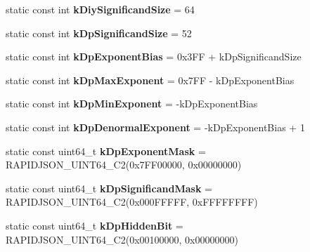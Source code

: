 \begin{DoxyCompactItemize}
\item 
static const int {\bfseries k\+Diy\+Significand\+Size} = 64\hypertarget{structinternal_1_1_diy_fp_a04f345587c1a89ae1c8d6a8091975072}{}\label{structinternal_1_1_diy_fp_a04f345587c1a89ae1c8d6a8091975072}

\item 
static const int {\bfseries k\+Dp\+Significand\+Size} = 52\hypertarget{structinternal_1_1_diy_fp_ad39d6d90566612195625aecc5c3f5bdc}{}\label{structinternal_1_1_diy_fp_ad39d6d90566612195625aecc5c3f5bdc}

\item 
static const int {\bfseries k\+Dp\+Exponent\+Bias} = 0x3\+F\+F + k\+Dp\+Significand\+Size\hypertarget{structinternal_1_1_diy_fp_ae6320c488000ab79b7eea02e09de80bd}{}\label{structinternal_1_1_diy_fp_ae6320c488000ab79b7eea02e09de80bd}

\item 
static const int {\bfseries k\+Dp\+Max\+Exponent} = 0x7\+F\+F -\/ k\+Dp\+Exponent\+Bias\hypertarget{structinternal_1_1_diy_fp_a1319a65d52de11aca8ba76e0585e62e7}{}\label{structinternal_1_1_diy_fp_a1319a65d52de11aca8ba76e0585e62e7}

\item 
static const int {\bfseries k\+Dp\+Min\+Exponent} = -\/k\+Dp\+Exponent\+Bias\hypertarget{structinternal_1_1_diy_fp_a2831bc21dbe8c884d922223c726b4882}{}\label{structinternal_1_1_diy_fp_a2831bc21dbe8c884d922223c726b4882}

\item 
static const int {\bfseries k\+Dp\+Denormal\+Exponent} = -\/k\+Dp\+Exponent\+Bias + 1\hypertarget{structinternal_1_1_diy_fp_a08ace8502dee41fc3508280df6b82fd3}{}\label{structinternal_1_1_diy_fp_a08ace8502dee41fc3508280df6b82fd3}

\item 
static const uint64\+\_\+t {\bfseries k\+Dp\+Exponent\+Mask} = R\+A\+P\+I\+D\+J\+S\+O\+N\+\_\+\+U\+I\+N\+T64\+\_\+\+C2(0x7\+F\+F00000, 0x00000000)\hypertarget{structinternal_1_1_diy_fp_a5b1d7c8dca16075aef43b5eb8f897bd0}{}\label{structinternal_1_1_diy_fp_a5b1d7c8dca16075aef43b5eb8f897bd0}

\item 
static const uint64\+\_\+t {\bfseries k\+Dp\+Significand\+Mask} = R\+A\+P\+I\+D\+J\+S\+O\+N\+\_\+\+U\+I\+N\+T64\+\_\+\+C2(0x000\+F\+F\+F\+F\+F, 0x\+F\+F\+F\+F\+F\+F\+F\+F)\hypertarget{structinternal_1_1_diy_fp_ad3a626516ab4c84eeca336a66e70dda8}{}\label{structinternal_1_1_diy_fp_ad3a626516ab4c84eeca336a66e70dda8}

\item 
static const uint64\+\_\+t {\bfseries k\+Dp\+Hidden\+Bit} = R\+A\+P\+I\+D\+J\+S\+O\+N\+\_\+\+U\+I\+N\+T64\+\_\+\+C2(0x00100000, 0x00000000)\hypertarget{structinternal_1_1_diy_fp_ab04f9f5ca4fe81e61c1658d3317d5f94}{}\label{structinternal_1_1_diy_fp_ab04f9f5ca4fe81e61c1658d3317d5f94}

\end{DoxyCompactItemize}


